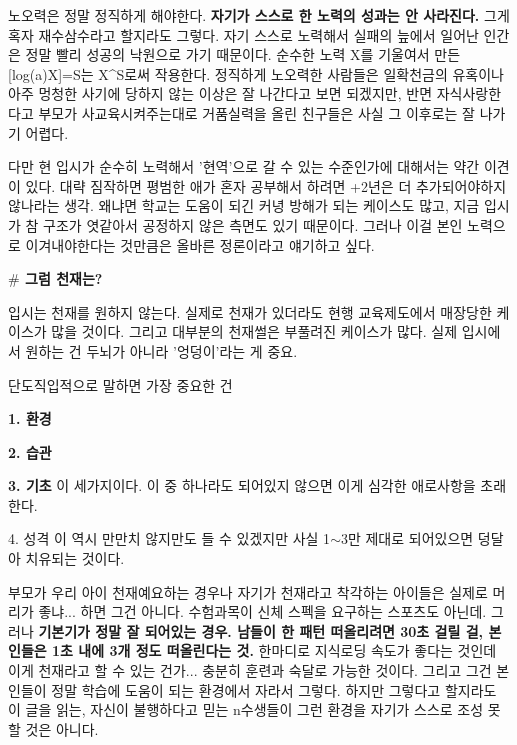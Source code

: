 노오력은 정말 정직하게 해야한다. \textbf{자기가 스스로 한 노력의 성과는 안 사라진다.}
그게 혹자 재수삼수라고 할지라도 그렇다. 자기 스스로 노력해서 실패의 늪에서 일어난 인간은 정말 빨리 성공의 낙원으로 가기 때문이다.
순수한 노력 X를 기울여서 만든 [log(a)X]=S는 X^S로써 작용한다.
정직하게 노오력한 사람들은 일확천금의 유혹이나 아주 멍청한 사기에 당하지 않는 이상은 잘 나간다고 보면 되겠지만,
반면 자식사랑한다고 부모가 사교육시켜주는대로 거품실력을 올린 친구들은 사실 그 이후로는 잘 나가기 어렵다.
\vspace{5mm}

다만 현 입시가 순수히 노력해서 '현역'으로 갈 수 있는 수준인가에 대해서는 약간 이견이 있다.
대략 짐작하면 평범한 애가 혼자 공부해서 하려면 +2년은 더 추가되어야하지 않나라는 생각.
왜냐면 학교는 도움이 되긴 커녕 방해가 되는 케이스도 많고, 지금 입시가 참 구조가 엿같아서 공정하지 않은 측면도 있기 때문이다.
그러나 이걸 본인 노력으로 이겨내야한다는 것만큼은 올바른 정론이라고 얘기하고 싶다.
\vspace{5mm}

\textbf{$\#$ 그럼 천재는?}
\vspace{5mm}

입시는 천재를 원하지 않는다. 실제로 천재가 있더라도 현행 교육제도에서 매장당한 케이스가 많을 것이다.
그리고 대부분의 천재썰은 부풀려진 케이스가 많다.
실제 입시에서 원하는 건 두뇌가 아니라 '엉덩이'라는 게 중요.
\vspace{5mm}

단도직입적으로 말하면 가장 중요한 건
\item \textbf{1. 환경}
\item \textbf{2. 습관}
\item \textbf{3. 기초}
이 세가지이다. 이 중 하나라도 되어있지 않으면 이게 심각한 애로사항을 초래한다.
\item 4. 성격
이 역시 만만치 않지만도 들 수 있겠지만 사실 1$\sim$3만 제대로 되어있으면 덩달아 치유되는 것이다.
\vspace{5mm}

부모가 우리 아이 천재예요하는 경우나 자기가 천재라고 착각하는 아이들은 실제로 머리가 좋냐... 하면 그건 아니다.
수험과목이 신체 스펙을 요구하는 스포츠도 아닌데.
그러나 \textbf{기본기가 정말 잘 되어있는 경우. 남들이 한 패턴 떠올리려면 30초 걸릴 걸, 본인들은 1초 내에 3개 정도 떠올린다는 것.}
한마디로 지식로딩 속도가 좋다는 것인데 이게 천재라고 할 수 있는 건가... 충분히 훈련과 숙달로 가능한 것이다.
그리고 그건 본인들이 정말 학습에 도움이 되는 환경에서 자라서 그렇다.
하지만 그렇다고 할지라도 이 글을 읽는, 자신이 불행하다고 믿는 n수생들이 그런 환경을 자기가 스스로 조성 못할 것은 아니다.
\vspace{5mm}

